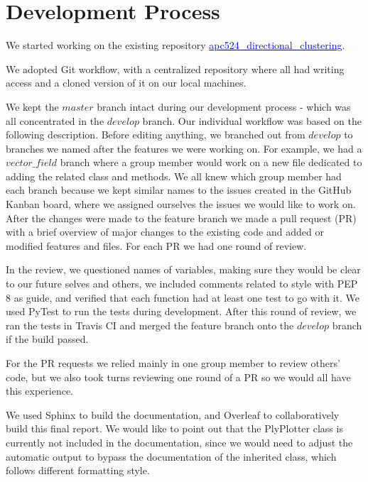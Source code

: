 \documentclass[11pt]{article}
\begin{document}
\section{Development Process}
\label{section:development}

We started working on the existing repository  \href{https://github.com/arpastrana/apc524_directional_clustering}{\textcolor{blue}{apc524\_directional\_clustering}}.

We adopted Git workflow, with a centralized repository where all had writing access and a cloned version of it on our local machines. 

We kept the $master$ branch intact during our development process - which was all concentrated in the $develop$ branch. Our individual workflow was based on the following description. Before editing anything, we branched out from $develop$ to branches we named after the features we were working on. For example, we had a $vector\_field$ branch where a group member would work on a new file dedicated to adding the related class and methods. We all knew which group member had each branch because we kept similar names to the issues created in the GitHub Kanban board, where we assigned ourselves the issues we would like to work on. 
After the changes were made to the feature branch we made a pull request (PR) with a brief overview of major changes to the existing code and added or modified features and files. For each PR we had one round of review.

In the review, we questioned names of variables, making sure they would be clear to our future selves and others, we included comments related to style with PEP 8 as guide, and verified that each function had at least one test to go with it. We used PyTest to run the tests during development. After this round of review, we ran the tests in Travis CI and merged the feature branch onto the $develop$ branch if the build passed.

For the PR requests we relied mainly in one group member to review others' code, but we also took turns reviewing one round of a PR so we would all have this experience. 

We used Sphinx to build the documentation, and Overleaf to collaboratively build this final report. We would like to point out that the PlyPlotter class is currently not included in the documentation, since we would need to adjust the automatic output to bypass the documentation of the inherited class, which follows different formatting style.
\end{document}
